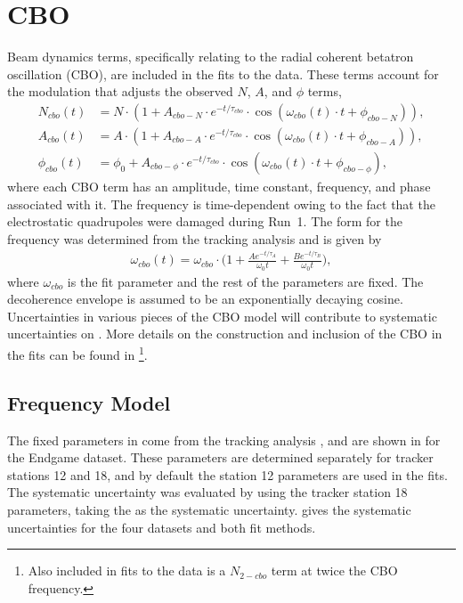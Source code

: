 
\graphicspath{{Body/Figures/CBO/}{Body/Figures/CBO/Frequency/}{Body/Figures/CBO/TimeConstants/}}

\clearpage
\section{CBO}


Beam dynamics terms, specifically relating to the radial coherent betatron oscillation (CBO), are included in the fits to the data. These terms account for the modulation that adjusts the observed $N$, $A$, and $\phi$ terms,
    \begin{align}
        N_{cbo}(t) &= N \cdot (1 + A_{cbo-N} \cdot e^{-t/\tau_{cbo}} \cdot \cos(\omega_{cbo}(t) \cdot t + \phi_{cbo-N})), \label{eq:Ncbo} \\ 
        A_{cbo}(t) &= A \cdot (1 + A_{cbo-A} \cdot e^{-t/\tau_{cbo}} \cdot \cos(\omega_{cbo}(t) \cdot t + \phi_{cbo-A})), \label{eq:Acbo} \\ 
        \phi_{cbo}(t) &= \phi_{0} + A_{cbo-\phi} \cdot e^{-t/\tau_{cbo}} \cdot \cos(\omega_{cbo}(t) \cdot t + \phi_{cbo-\phi}), \label{eq:Phicbo}
    \end{align}
where each CBO term has an amplitude, time constant, frequency, and phase associated with it. The frequency is time-dependent owing to the fact that the electrostatic quadrupoles were damaged during Run~1. The form for the frequency was determined from the tracking analysis and is given by
    \begin{align} \label{eq:CBOfreqForm}
        \omega_{cbo}(t) = \omega_{cbo} \cdot \Big(1 + \frac{Ae^{-t/\tau_{A}}}{\omega_{0}t} + \frac{Be^{-t/\tau_{B}}}{\omega_{0}t}\Big),
    \end{align}
where $\omega_{cbo}$ is the fit parameter and the rest of the parameters are fixed. The decoherence envelope is assumed to be an exponentially decaying cosine. Uncertainties in various pieces of the CBO model will contribute to systematic uncertainties on \R. More details on the construction and inclusion of the CBO in the fits can be found in \footnote{Also included in fits to the data is a $N_{2-cbo}$ term at twice the CBO frequency.}.


\subsection{Frequency Model}

The fixed parameters in  come from the tracking analysis \cite{CBOFreqTrackingElog}, and are shown in  for the Endgame dataset. These parameters are determined separately for tracker stations 12 and 18, and by default the station 12 parameters are used in the fits. The systematic uncertainty was evaluated by using the tracker station 18 parameters, taking the \DR as the systematic uncertainty.  gives the systematic uncertainties for the four datasets and both fit methods.

